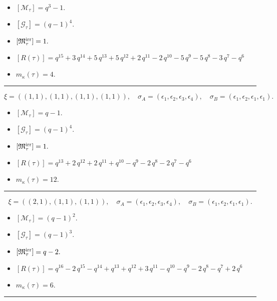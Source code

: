 \documentclass[10pt,a4paper]{amsart}
\begin{document}
\begin{itemize}
 \item $[\mathcal{M}_{\tau}] = q^{3} - 1 .$

 \item $[\mathcal{G}_{\tau}] = {\left(q - 1\right)}^{4} .$

 \item $[{\frak M}_{\tau}^{\textrm{irr}}] = 1 .$

 \item $[R(\tau)] = q^{15} + 3 \, q^{14} + 5 \, q^{13} + 5 \, q^{12} + 2 \, q^{11} - 2 \, q^{10} - 5 \, q^{9} - 5 \, q^{8} - 3 \, q^{7} - q^{6} $

 \item $m_{\kappa}(\tau) = 4 .$

 \end{itemize}
\noindent\rule{8cm}{0.4pt}

$$\xi = ({(1, 1), (1, 1), (1, 1)}, {(1, 1)}),\quad \sigma_A = ({{\epsilon_1}, {\epsilon_2}, {\epsilon_3}}, {{\epsilon_4}}),\quad \sigma_B = ({{\epsilon_1}, {\epsilon_2}, {\epsilon_1}}, {{\epsilon_1}}).$$

\begin{itemize}
 \item $[\mathcal{M}_{\tau}] = q - 1 .$

 \item $[\mathcal{G}_{\tau}] = {\left(q - 1\right)}^{4} .$

 \item $[{\frak M}_{\tau}^{\textrm{irr}}] = 1 .$

 \item $[R(\tau)] = q^{13} + 2 \, q^{12} + 2 \, q^{11} + q^{10} - q^{9} - 2 \, q^{8} - 2 \, q^{7} - q^{6} $

 \item $m_{\kappa}(\tau) = 12 .$

 \end{itemize}
\noindent\rule{8cm}{0.4pt}

$$\xi = ({(2, 1)}, {(1, 1), (1, 1)}),\quad \sigma_A = ({{\epsilon_1, \epsilon_2}}, {{\epsilon_3}, {\epsilon_4}}),\quad \sigma_B = ({{\epsilon_1, \epsilon_2}}, {{\epsilon_1}, {\epsilon_1}}).$$

\begin{itemize}
 \item $[\mathcal{M}_{\tau}] = {\left(q - 1\right)}^{2} .$

 \item $[\mathcal{G}_{\tau}] = {\left(q - 1\right)}^{3} .$

 \item $[{\frak M}_{\tau}^{\textrm{irr}}] = q - 2 .$

 \item $[R(\tau)] = q^{16} - 2 \, q^{15} - q^{14} + q^{13} + q^{12} + 3 \, q^{11} - q^{10} - q^{9} - 2 \, q^{8} - q^{7} + 2 \, q^{6} $

 \item $m_{\kappa}(\tau) = 6 .$

 \end{itemize}
\noindent\rule{8cm}{0.4pt}
\end{document}
